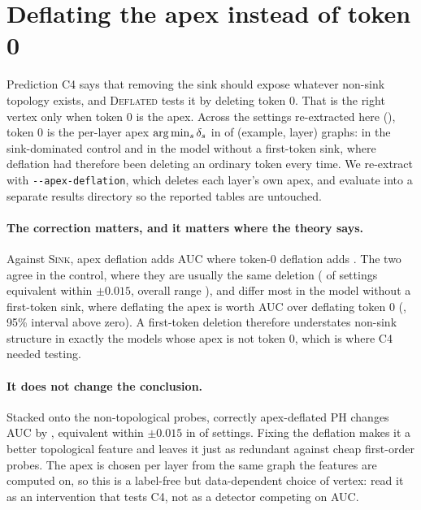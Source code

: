 \begin{table}[h]
\centering
\small
\caption{\textbf{TOHA on RAGTruth} (\RagModel{}, \RagExamples{} responses). \emph{viol.}: violations of the Proposition~\ref{prop:toha} sandwich. \emph{coned}: share of head graphs with $\defect_P=0$, on which $d$ equals the $\bar\pi$-score exactly. $\rho$: median over heads of the Spearman correlation across examples. Buckets are by total sequence length in tokens.}
\label{tab:rag}
\resizebox{\linewidth}{!}{\SinkTableRag}
\end{table}

\section{Deflating the apex instead of token 0}
\label{app:apex}

Prediction C4 says that removing the sink should expose whatever non-sink topology exists, and \textsc{Deflated} tests it by deleting token 0. That is the right vertex only when token 0 is the apex. Across the \ApexSettings{} settings re-extracted here (\ApexList{}), token 0 is the per-layer apex $\arg\min_s\delta_s$ in \ApexIsZeroRange{} of (example, layer) graphs: \ApexIsZeroMax{} in the sink-dominated control and \ApexIsZeroMin{} in the model without a first-token sink, where deflation had therefore been deleting an ordinary token every time. We re-extract with \texttt{-{}-apex-deflation}, which deletes each layer's own apex, and evaluate into a separate results directory so the reported tables are untouched.

\paragraph{The correction matters, and it matters where the theory says.} Against \textsc{Sink}, apex deflation adds \ApexBeyondSinkRange{} AUC where token-0 deflation adds \DeflBeyondSinkRange{}. The two agree in the control, where they are usually the same deletion (\ApexVsDeflEquiv{} of \ApexVsDeflTotal{} settings equivalent within $\pm0.015$, overall range \ApexVsDeflRange{}), and differ most in the model without a first-token sink, where deflating the apex is worth \ApexVsDeflMax{} AUC over deflating token 0 (\ApexVsDeflMaxSetting{}, 95\% interval above zero). A first-token deletion therefore understates non-sink structure in exactly the models whose apex is not token 0, which is where C4 needed testing.

\paragraph{It does not change the conclusion.} Stacked onto the non-topological probes, correctly apex-deflated PH changes AUC by \ApexBeyondNTRange{}, equivalent within $\pm0.015$ in \ApexBeyondNTEquiv{} of \ApexBeyondNTTotal{} settings. Fixing the deflation makes it a better topological feature and leaves it just as redundant against cheap first-order probes. The apex is chosen per layer from the same graph the features are computed on, so this is a label-free but data-dependent choice of vertex: read it as an intervention that tests C4, not as a detector competing on AUC.

